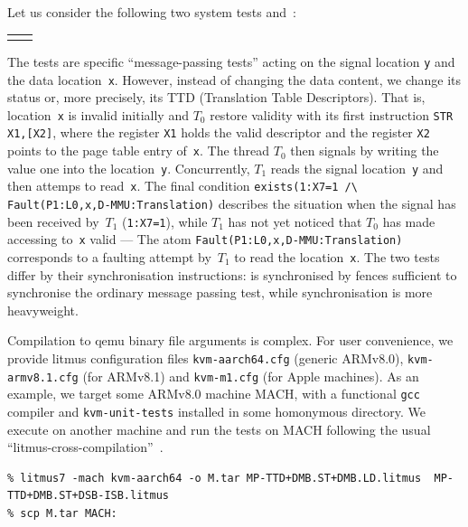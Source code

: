 Let us consider the following two system tests
 and~:
\begin{center}
\begin{tabular}{p{.45\linewidth}p{.4\linewidth}}

&

\end{tabular}
\end{center}
The tests are specific ``message-passing tests'' acting on the signal
location \texttt{y} and the data location~\texttt{x}. However, instead
of changing the data content, we change its status or, more precisely,
its TTD (Translation Table Descriptors). That is, location~\texttt{x} is
invalid initially and $T_0$ restore validity with its first
instruction \texttt{STR X1,[X2]}, where the register \texttt{X1} holds
the valid descriptor and the register \texttt{X2} points to the page table
entry of~\texttt{x}. The thread $T_0$ then signals by writing the
value one into the location~\texttt{y}. Concurrently, $T_1$ reads the
signal location~\texttt{y} and then attemps to read~\texttt{x}.
The final condition
\verb+exists(1:X7=1 /\ Fault(P1:L0,x,D-MMU:Translation)+
describes the situation when the signal has been received by~$T_1$
(\texttt{1:X7=1}), while $T_1$ has not yet noticed that $T_0$ has made
accessing to~\texttt{x} valid
--- The atom \texttt{Fault(P1:L0,x,D-MMU:Translation)} corresponds to a
faulting attempt by~$T_1$ to read the location~\texttt{x}.
The two tests differ by their synchronisation
instructions:  is synchronised by fences
sufficient to synchronise the ordinary message passing test,
while   synchronisation is more
heavyweight.

Compilation to qemu binary file arguments is complex.
For user convenience, we provide litmus configuration
files \texttt{kvm-aarch64.cfg} (generic
ARMv8.0), \texttt{kvm-armv8.1.cfg} (for ARMv8.1)
and  \texttt{kvm-m1.cfg} (for Apple machines).
As an example, we target some ARMv8.0 machine MACH, with a
functional \texttt{gcc} compiler and \texttt{kvm-unit-tests} installed
in some homonymous directory.  We execute \litmus{} on another machine
and run the tests on MACH following the usual
``litmus-cross-compilation''~.
\begin{verbatim}
% litmus7 -mach kvm-aarch64 -o M.tar MP-TTD+DMB.ST+DMB.LD.litmus  MP-TTD+DMB.ST+DSB-ISB.litmus
% scp M.tar MACH:
\end{verbatim}

